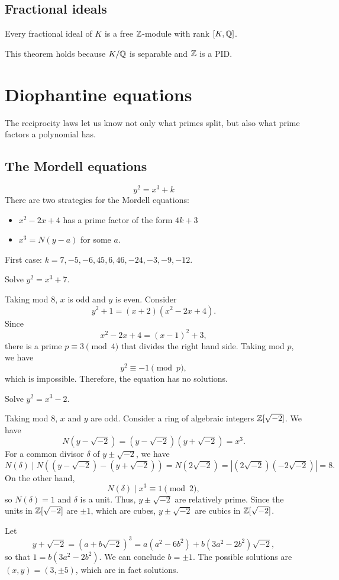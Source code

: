 \documentclass{article}
\let\realsection\section
\renewcommand\section{\newpage\realsection}
\begin{document}
\subsection{Fractional ideals}
\begin{thm}
Every fractional ideal of $K$ is a free $\mathbb{Z}$-module with rank $[K,\mathbb{Q}]$.
\end{thm}
\begin{pf}
This theorem holds because $K/\mathbb{Q}$ is separable and $\mathbb{Z}$ is a PID.

\end{pf}






\section{Diophantine equations}
The reciprocity laws let us know not only what primes split, but also what prime factors a polynomial has.
\subsection{The Mordell equations}
\[y^2=x^3+k\]
There are two strategies for the Mordell equations:
\begin{itemize}
\item $x^2-2x+4$ has a prime factor of the form $4k+3$
\item $x^3=N(y-a)$ for some $a$.
\end{itemize}
First case: $k=7,-5,-6,45,6,46,-24,-3,-9,-12$.
\begin{ex} Solve $y^2=x^3+7$. \end{ex}
\begin{pf}
Taking mod 8, $x$ is odd and $y$ is even.
Consider
\[y^2+1=(x+2)(x^2-2x+4).\]
Since
\[x^2-2x+4=(x-1)^2+3,\]
there is a prime $p\equiv3\pmod4$ that divides the right hand side.
Taking mod $p$, we have
\[y^2\equiv-1\pmod p,\]
which is impossible.
Therefore, the equation has no solutions.
\end{pf}
\begin{ex} Solve $y^2=x^3-2$. \end{ex}
\begin{pf}
Taking mod 8, $x$ and $y$ are odd.
Consider a ring of algebraic integers $\mathbb{Z}[\sqrt{-2}]$.
We have
\[N(y-\sqrt{-2})=(y-\sqrt{-2})(y+\sqrt{-2})=x^3.\]
For a common divisor $\delta$ of $y\pm\sqrt{-2}$, we have 
\[N(\delta)\mid N((y-\sqrt{-2})-(y+\sqrt{-2}))=N(2\sqrt{-2})=|(2\sqrt{-2})(-2\sqrt{-2})|=8.\]
On the other hand,
\[N(\delta)\mid x^3 \equiv1\pmod2,\]
so $N(\delta)=1$ and $\delta$ is a unit.
Thus, $y\pm\sqrt{-2}$ are relatively prime.
Since the units in $\mathbb{Z}[\sqrt{-2}]$ are $\pm1$, which are cubes, $y\pm\sqrt{-2}$ are cubics in $\mathbb{Z}[\sqrt{-2}]$.

Let
\[y+\sqrt{-2}=(a+b\sqrt{-2})^3=a(a^2-6b^2)+b(3a^2-2b^2)\sqrt{-2},\]
so that $1=b(3a^2-2b^2)$.
We can conclude $b=\pm1$.
The possible solutions are $(x,y)=(3,\pm5)$, which are in fact solutions.
\end{pf}
\end{document}
